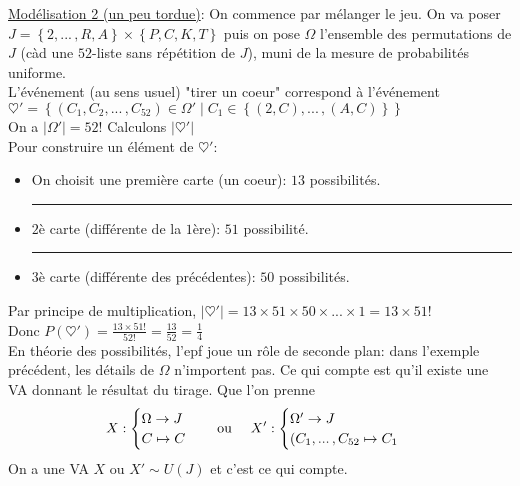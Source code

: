 \documentclass[10pt,a4paper]{article}
\theoremstyle{definition}
\begin{document}
\noindent \uline{Modélisation 2 (un peu tordue)}: On commence par mélanger le jeu. On va poser $J = \left\{ 2, ...\,, R, A \right\} \times \left\{ P, C, K, T \right\}$ puis on pose $\Omega$ l'ensemble des permutations de $J$ (càd une $52$-liste sans répétition de $J$), muni de la mesure de probabilités uniforme. \\
L'événement (au sens usuel) "tirer un coeur" correspond à l'événement \\
$\heartsuit' = \left\{ (C_1, C_2, ...\,, C_{52}) \in \Omega' \mid C_1 \in \left\{ (2, C), ...\,, (A, C) \right\} \right\}$ \\
On a $\left| \Omega' \right| = 52!$ Calculons $\left| \heartsuit' \right|$ \\
Pour construire un élément de $\heartsuit'$:
\begin{itemize}
\item On choisit une première carte (un coeur): $13$ possibilités.
\item \rule{5em}{1pt} $2$è carte (différente de la $1$ère): $51$ possibilité.
\item \rule{5em}{1pt} $3$è carte (différente des précédentes): $50$ possibilités.
\end{itemize}
Par principe de multiplication, $\left| \heartsuit' \right| = 13 \times 51 \times 50 \times ... \times 1 = 13 \times 51!$ \\
Donc $P(\heartsuit') = \frac{13 \times 51!}{52!} = \frac{13}{52} = \frac{1}{4}$ \\
En théorie des possibilités, l'epf joue un rôle de seconde plan: dans l'exemple précédent, les détails de $\Omega$ n'importent pas. Ce qui compte est qu'il existe une VA donnant le résultat du tirage. Que l'on prenne
\[ X: \begin{cases}
\Omega \to J \\
C \mapsto C
\end{cases} \text{\quad ou \quad}
X': \begin{cases}
\Omega' \to J \\
(C_1, ...\,, C_{52} \mapsto C_1
\end{cases}\]
On a une VA $X$ ou $X' \sim U(J)$ et c'est ce qui compte.
\end{document}
